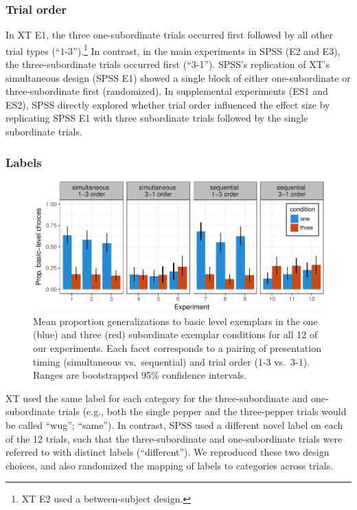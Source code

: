 \documentclass[english,floatsintext,man]{apa6}
\theoremstyle{definition}
\theoremstyle{definition}
\theoremstyle{remark}
\begin{document}
\subsubsection{Trial order}\label{trial-order}

In XT E1, the three one-subordinate trials occurred first followed by
all other trial types
(\enquote{1-3}).\footnote{XT E2 used a between-subject design.} In
contrast, in the main experiments in SPSS (E2 and E3), the
three-subordinate trials occurred first (\enquote{3-1}). SPSS's
replication of XT's simultaneous design (SPSS E1) showed a single block
of either one-subordinate or three-subordinate first (randomized). In
supplemental experiments (ES1 and ES2), SPSS directly explored whether
trial order influenced the effect size by replicating SPSS E1 with three
subordinate trials followed by the single subordinate trials.

\subsubsection{Labels}\label{labels}

\begin{figure}[htbp]
\centering
\includegraphics{xtmem_files/figure-latex/unnamed-chunk-3-1.pdf}
\caption{\label{fig:unnamed-chunk-3}Mean proportion generalizations to basic
level exemplars in the one (blue) and three (red) subordinate exemplar
conditions for all 12 of our experiments. Each facet corresponds to a
pairing of presentation timing (simultaneous vs.~sequential) and trial
order (1-3 vs.~3-1). Ranges are bootstrapped 95\% confidence intervals.}
\end{figure}

XT used the same label for each category for the three-subordinate and
one-subordinate trials (e.g., both the single pepper and the
three-pepper trials would be called \enquote{wug}; \enquote{same}). In
contrast, SPSS used a different novel label on each of the 12 trials,
such that the three-subordinate and one-subordinate trials were referred
to with distinct labels (\enquote{different}). We reproduced these two
design choices, and also randomized the mapping of labels to categories
across trials.
\end{document}
